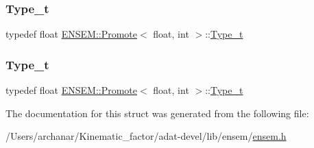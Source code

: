 \subsubsection{\texorpdfstring{Type\_t}{Type\_t}\hspace{0.1cm}{\footnotesize\ttfamily [2/3]}}
{\footnotesize\ttfamily typedef float \mbox{\hyperlink{structENSEM_1_1Promote}{E\+N\+S\+E\+M\+::\+Promote}}$<$ float, int $>$\+::\mbox{\hyperlink{structENSEM_1_1Promote_3_01float_00_01int_01_4_ac183cf99d20cafab1e283ee7435667af}{Type\+\_\+t}}}

\mbox{\label{structENSEM_1_1Promote_3_01float_00_01int_01_4_ac183cf99d20cafab1e283ee7435667af}} 
\subsubsection{\texorpdfstring{Type\_t}{Type\_t}\hspace{0.1cm}{\footnotesize\ttfamily [3/3]}}
{\footnotesize\ttfamily typedef float \mbox{\hyperlink{structENSEM_1_1Promote}{E\+N\+S\+E\+M\+::\+Promote}}$<$ float, int $>$\+::\mbox{\hyperlink{structENSEM_1_1Promote_3_01float_00_01int_01_4_ac183cf99d20cafab1e283ee7435667af}{Type\+\_\+t}}}



The documentation for this struct was generated from the following file\+:\begin{DoxyCompactItemize}
\item 
/\+Users/archanar/\+Kinematic\+\_\+factor/adat-\/devel/lib/ensem/\mbox{\hyperlink{adat-devel_2lib_2ensem_2ensem_8h}{ensem.\+h}}\end{DoxyCompactItemize}

